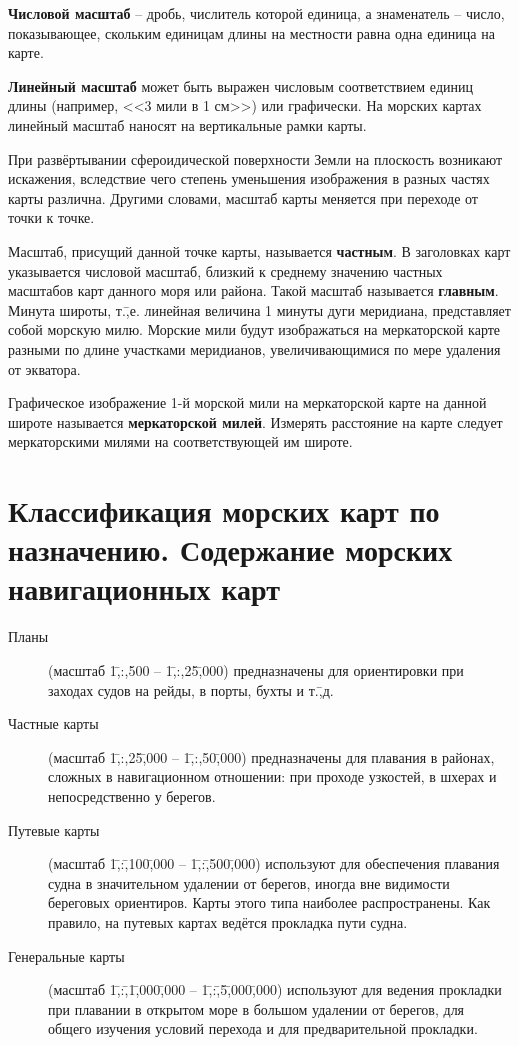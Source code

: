 \textbf{Числовой масштаб} \--- дробь,
числитель которой единица, а знаменатель \--- число, показывающее,
скольким единицам длины на местности равна одна единица на карте.

\textbf{Линейный масштаб} может быть
выражен числовым соответствием единиц длины (например, <<3 мили в 1
см>>) или графически. На морских картах линейный масштаб наносят на
вертикальные рамки карты.

При развёртывании сфероидической поверхности Земли на плоскость
возникают искажения, вследствие чего степень уменьшения изображения в
разных частях карты различна. Другими словами, масштаб карты меняется
при переходе от точки к точке.

Масштаб, присущий данной точке карты, называется \textbf{частным}. В
заголовках карт указывается числовой масштаб, близкий к среднему
значению частных масштабов карт данного моря или района. Такой масштаб
называется \textbf{главным}. Минута широты, т.\=,е. линейная величина
1 минуты дуги меридиана, представляет собой морскую милю. Морские мили
будут изображаться на меркаторской карте разными по длине участками
меридианов, увеличивающимися по мере удаления от экватора.

Графическое изображение 1-й морской мили на меркаторской карте на
данной широте называется \textbf{меркаторской
  милей}. Измерять расстояние на карте
следует меркаторскими милями на соответствующей им широте.

\section{Классификация морских карт по назначению. Содержание морских навигационных карт}

\begin{description} 
\item [Планы] (масштаб 1\=,:\-,500 \--- 1\=,:\-,25\=,000)
  предназначены для ориентировки при заходах судов на рейды, в порты,
  бухты и т.\=,д.
\item [Частные карты] (масштаб 1\=,:\-,25\=,000
  \--- 1\=,:\-,50\=,000) предназначены для плавания в районах, сложных
  в навигационном отношении: при проходе узкостей, в шхерах и
  непосредственно у берегов.
\item [Путевые карты] (масштаб 1\=,:\=,100\=,000
  \--- 1\=,:\=,500\=,000) используют для обеспечения плавания судна в
  значительном удалении от берегов, иногда вне видимости береговых
  ориентиров. Карты этого типа наиболее распространены. Как правило,
  на путевых картах ведётся прокладка пути судна.
\item [Генеральные карты] (масштаб
  1\=,:\=,1\=,000\=,000 \--- 1\=,:\=,5\=,000\=,000) используют для
  ведения прокладки при плавании в открытом море в большом удалении от
  берегов, для общего изучения условий перехода и для предварительной
  прокладки.
\end{description}

